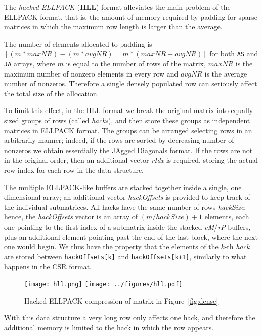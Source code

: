 The \textit{hacked ELLPACK} (\textbf{HLL}) format 
alleviates the main problem of the ELLPACK format, that is, 
the  amount of  memory required by  padding for  sparse matrices in
which the maximum row length is  larger than the average.

The number of  elements  allocated to padding is $[(m*maxNR) -
(m*avgNR) = m*(maxNR-avgNR)]$ 
for both \verb|AS|  and \verb|JA| arrays,
where $m$ is equal to the number of rows of the matrix, $maxNR$ is the
maximum number of nonzero elements 
in every row and $avgNR$ is the average number of nonzeros. 
Therefore a single densely populated row can seriously affect the
total size of the allocation. 

To limit this effect, in the HLL format  we break the original matrix
into equally sized groups of rows (called \textit{hacks}), and then store
these groups as independent matrices in ELLPACK format. 
The groups can be arranged selecting rows in an arbitrarily manner;
indeed, if the rows are sorted by decreasing number of nonzeros we
obtain essentially the JAgged Diagonals format. 
If the rows are not in the original order, then an   additional vector
\textit{rIdx} is required, storing the actual row index  for each row
in the data structure.

The multiple ELLPACK-like buffers are stacked together inside a
single, one dimensional array; 
an additional  vector \textit{hackOffsets} is provided to keep track
of the individual submatrices.
All hacks have the same number of rows  \textit{hackSize}; hence, 
the \textit{hackOffsets} vector is  an array of
$(m/hackSize)+1$ elements, each one pointing  to the first index of a
submatrix inside the stacked \textit{cM}/\textit{rP} buffers, plus an
additional element pointing past the end of the last block, where the
next one would begin. 
We thus have the property that  
the elements of the $k$-th \textit{hack} are stored between
\verb|hackOffsets[k]| and 
\verb|hackOffsets[k+1]|, similarly to what happens in the CSR format. 

\begin{figure}[ht]
	\centering
\ifcase\pdfoutput
  \texttt{[image: hll.png]}
\or
  \texttt{[image: ../figures/hll.pdf]}
\fi
	\caption{Hacked ELLPACK compression of matrix in Figure~\ref{fig:dense}}
	\label{fig:hll}
\end{figure} 

With this data structure a very long row only affects one hack, and
therefore the additional memory is limited to the hack in which the
row appears.

